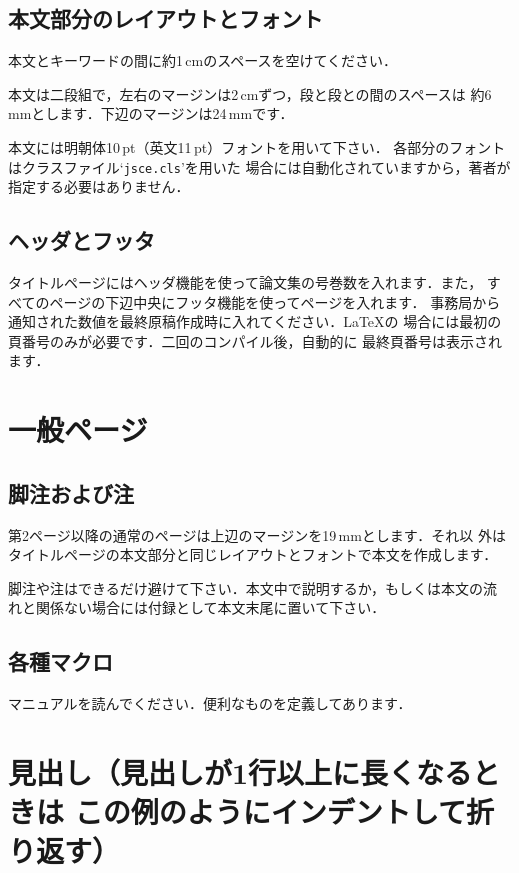 \documentclass[nosetpagesize]{jsce}
\begin{document}
\subsection{本文部分のレイアウトとフォント}

本文とキーワードの間に約1\,cmのスペースを空けてください．

本文は二段組で，左右のマージンは2\,cmずつ，段と段との間のスペースは
約6\,mmとします．下辺のマージンは24\,mmです．

本文には明朝体10\,pt（英文11\,pt）フォントを用いて下さい．
各部分のフォントはクラスファイル`{\tt jsce.cls}'を用いた
場合には自動化されていますから，著者が指定する必要はありません．

\subsection{ヘッダとフッタ}

タイトルページにはヘッダ機能を使って論文集の号巻数を入れます．また，
すべてのページの下辺中央にフッタ機能を使ってページを入れます．
事務局から通知された数値を最終原稿作成時に入れてください．\LaTeX の
場合には最初の頁番号のみが必要です．二回のコンパイル後，自動的に
最終頁番号は表示されます．

\section{一般ページ}

\subsection{脚注および注}

第2ページ以降の通常のページは上辺のマージンを19\,mmとします．それ以
外はタイトルページの本文部分と同じレイアウトとフォントで本文を作成します．

脚注や注はできるだけ避けて下さい．本文中で説明するか，もしくは本文の流
れと関係ない場合には付録として本文末尾に置いて下さい．

\subsection{各種マクロ}

マニュアルを読んでください．便利なものを定義してあります．

\section{見出し（見出しが1行以上に長くなるときは
この例のようにインデントして折り返す）}
\end{document}
